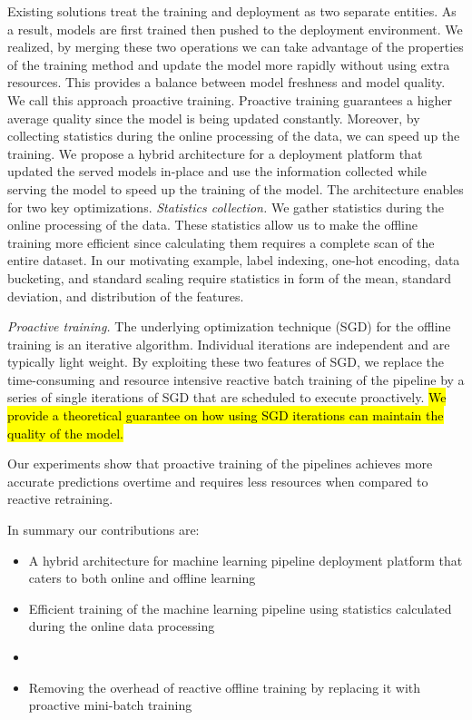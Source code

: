 Existing solutions treat the training and deployment as two separate entities. 
As a result, models are first trained then pushed to the deployment environment.
We realized, by merging these two operations we can take advantage of the properties of the training method and update the model more rapidly without using extra resources.
This provides a balance between model freshness and model quality.
We call this approach proactive training.
Proactive training guarantees a higher average quality since the model is being updated constantly.
Moreover, by collecting statistics during the online processing of the data, we can speed up the training.
We propose a hybrid architecture for a deployment platform that updated the served models in-place and use the information collected while serving the model to speed up the training of the model.
The architecture enables for two key optimizations.
\textit{Statistics collection. } 
We gather statistics during the online processing of the data. 
These statistics allow us to make the offline training more efficient since calculating them requires a complete scan of the entire dataset.
In our motivating example, label indexing, one-hot encoding, data bucketing, and standard scaling require statistics in form of the mean, standard deviation, and distribution of the features.

\textit{Proactive training.}
The underlying optimization technique (SGD) for the offline training is an iterative algorithm.
Individual iterations are independent and are typically light weight.
By exploiting these two features of SGD, we replace the time-consuming and resource intensive reactive batch training of the pipeline by a series of single iterations of SGD that are scheduled to execute proactively.
\hl{We provide a theoretical guarantee on how using SGD iterations can maintain the quality of the model.}

Our experiments show that proactive training of the pipelines achieves more accurate predictions overtime and requires less resources when compared to reactive retraining.

In summary our contributions are:
\begin{itemize}
\item A hybrid architecture for machine learning pipeline deployment platform that caters to both online and offline learning
\item Efficient training of the machine learning pipeline using statistics calculated during the online data processing
\item 
\item Removing the overhead of reactive offline training by replacing it with proactive mini-batch training
\end{itemize}

